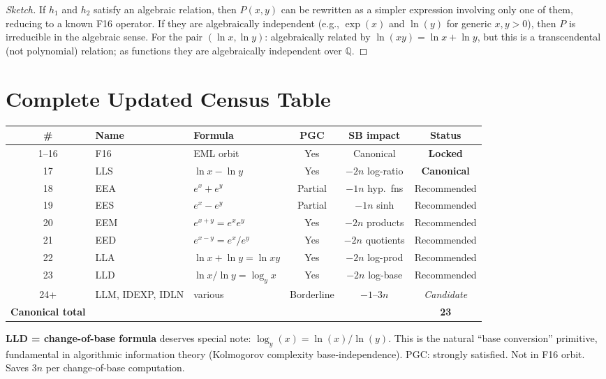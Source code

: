 \documentclass[11pt]{article}
\begin{document}
\begin{proof}[Sketch]
If $h_1$ and $h_2$ satisfy an algebraic relation, then $P(x,y)$ can be
rewritten as a simpler expression involving only one of them, reducing to a known F16 operator.
If they are algebraically independent (e.g., $\exp(x)$ and $\ln(y)$ for generic $x, y > 0$),
then $P$ is irreducible in the algebraic sense.
For the pair $(\ln x, \ln y)$: algebraically related by $\ln(xy) = \ln x + \ln y$,
but this is a transcendental (not polynomial) relation; as functions they are
algebraically independent over $\mathbb{Q}$.
\end{proof}

\section{Complete Updated Census Table}
\label{sec:census}

\begin{longtable}{cllccc}
\toprule
\# & Name & Formula & PGC & SB impact & Status \\
\midrule
1--16 & F16 & EML orbit & Yes & Canonical & \textbf{Locked} \\
17 & LLS & $\ln x - \ln y$ & Yes & $-2n$ log-ratio & \textbf{Canonical} \\
18 & EEA & $e^x + e^y$ & Partial & $-1n$ hyp.\ fns & Recommended \\
19 & EES & $e^x - e^y$ & Partial & $-1n$ sinh & Recommended \\
20 & EEM & $e^{x+y}=e^xe^y$ & Yes & $-2n$ products & Recommended \\
21 & EED & $e^{x-y}=e^x/e^y$ & Yes & $-2n$ quotients & Recommended \\
22 & LLA & $\ln x + \ln y=\ln xy$ & Yes & $-2n$ log-prod & Recommended \\
23 & LLD & $\ln x/\ln y=\log_y x$ & Yes & $-2n$ log-base & Recommended \\
24+ & LLM, IDEXP, IDLN & various & Borderline & $-1$--$3n$ & \emph{Candidate} \\
\midrule
\textbf{Canonical total} & & & & & \textbf{23} \\
\bottomrule
\end{longtable}

\noindent \textbf{LLD = change-of-base formula} deserves special note:
$\log_y(x) = \ln(x)/\ln(y)$.
This is the natural ``base conversion'' primitive, fundamental in
algorithmic information theory (Kolmogorov complexity base-independence).
PGC: strongly satisfied. Not in F16 orbit. Saves $3n$ per change-of-base computation.
\end{document}
